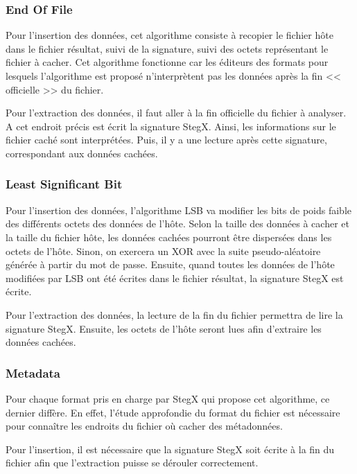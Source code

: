 \documentclass[11pt]{article}
\begin{document}

\subsubsection{End Of File}

Pour l'insertion des données, cet algorithme consiste à recopier le fichier 
hôte dans le fichier résultat, suivi de la signature, suivi des octets 
représentant le fichier à cacher. Cet algorithme fonctionne car les éditeurs 
des formats pour lesquels l'algorithme est proposé n'interprètent pas les données 
après la fin << officielle >> du fichier. 

Pour l'extraction des données, il faut aller à la fin officielle du fichier 
à analyser. A cet endroit précis est écrit la signature StegX. Ainsi, 
les informations sur le fichier caché sont interprétées. Puis, il y a une 
lecture après cette signature, correspondant aux données cachées. 

\subsubsection{Least Significant Bit}

Pour l'insertion des données, l'algorithme LSB va modifier les bits de 
poids faible des différents octets des données de l'hôte. Selon la taille des
données à cacher et la taille du fichier hôte, les données cachées pourront 
être dispersées dans les octets de l'hôte. Sinon, on exercera un XOR avec 
la suite pseudo-aléatoire générée à partir du mot de passe. 
Ensuite, quand toutes les données de l'hôte modifiées par LSB ont été écrites 
dans le fichier résultat, la signature StegX est écrite. 

Pour l'extraction des données, la lecture de la fin du fichier permettra de 
lire la signature StegX. Ensuite, les octets de l'hôte seront lues afin d'extraire 
les données cachées. 

\subsubsection{Metadata}

Pour chaque format pris en charge par StegX qui propose cet algorithme, 
ce dernier diffère. En effet, l'étude approfondie du format du fichier est 
nécessaire pour connaître les endroits du fichier où cacher des métadonnées. 

Pour l'insertion, il est nécessaire que la signature StegX soit écrite à 
la fin du fichier afin que l'extraction puisse se dérouler correctement. 
\end{document}
